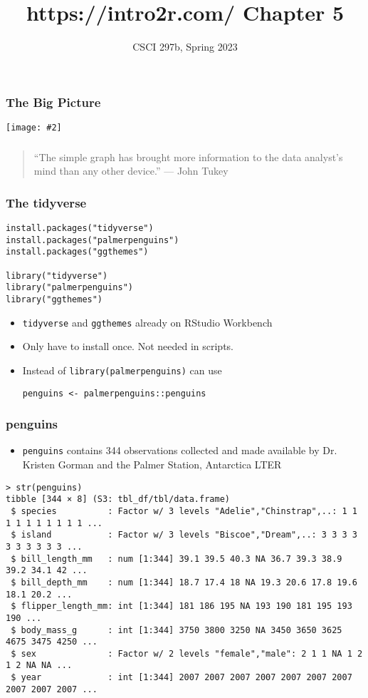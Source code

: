 \documentclass{beamer}
\title{{https://intro2r.com/} Chapter 5}
\author{CSCI 297b, Spring 2023}
\newcommand{\bi}{\begin{itemize}}
\newcommand{\li}{\item}
\newcommand{\ei}{\end{itemize}}
\newcommand{\fig}[2]{\centerline{\texttt{[image: \#2]}}}
\newcommand{\bfr}[1]{\begin{frame}[fragile]\frametitle{{ #1 }}}
\begin{document}
\begin{frame}
\maketitle
\end{frame}

\bfr{The Big Picture}
\fig{1}{whole-game.png}
\end{frame}

\bfr{}
\begin{quotation}

“The simple graph has brought more information to the data analyst’s mind than any other device.” — John Tukey
\end{quotation}
\end{frame}

\bfr{The tidyverse}
\begin{verbatim}
install.packages("tidyverse")
install.packages("palmerpenguins")
install.packages("ggthemes")

library("tidyverse")
library("palmerpenguins")
library("ggthemes")
\end{verbatim}
\bi
\li {\tt tidyverse} and {\tt ggthemes} already on RStudio Workbench
\li Only have to install once.  Not needed in scripts.
\li Instead of  {\tt library(palmerpenguins)} can use
\begin{verbatim}
penguins <- palmerpenguins::penguins
\end{verbatim}
\ei
\end{frame}

\bfr{penguins}
\bi
\li {\tt penguins} contains 344 observations collected and made available by Dr. Kristen Gorman and the Palmer Station, Antarctica LTER
\ei
\scriptsize
\begin{verbatim}
> str(penguins)
tibble [344 × 8] (S3: tbl_df/tbl/data.frame)
 $ species          : Factor w/ 3 levels "Adelie","Chinstrap",..: 1 1 1 1 1 1 1 1 1 1 ...
 $ island           : Factor w/ 3 levels "Biscoe","Dream",..: 3 3 3 3 3 3 3 3 3 3 ...
 $ bill_length_mm   : num [1:344] 39.1 39.5 40.3 NA 36.7 39.3 38.9 39.2 34.1 42 ...
 $ bill_depth_mm    : num [1:344] 18.7 17.4 18 NA 19.3 20.6 17.8 19.6 18.1 20.2 ...
 $ flipper_length_mm: int [1:344] 181 186 195 NA 193 190 181 195 193 190 ...
 $ body_mass_g      : int [1:344] 3750 3800 3250 NA 3450 3650 3625 4675 3475 4250 ...
 $ sex              : Factor w/ 2 levels "female","male": 2 1 1 NA 1 2 1 2 NA NA ...
 $ year             : int [1:344] 2007 2007 2007 2007 2007 2007 2007 2007 2007 2007 ...
\end{verbatim}
\end{frame}
\end{document}
